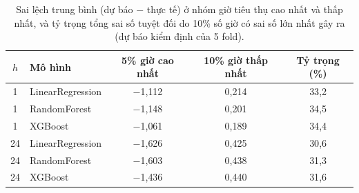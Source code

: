 \begin{table}[htbp]
\centering
\caption[Mức độ tập trung của sai số]{Sai lệch trung bình (dự báo $-$ thực tế) ở nhóm giờ tiêu thụ cao nhất và thấp nhất, và tỷ trọng tổng sai số tuyệt đối do 10\% số giờ có sai số lớn nhất gây ra (dự báo kiểm định của 5 fold).}
\label{tab:error_conc}
\small
\begin{tabular}{|c|l|c|c|c|}
\hline
\textbf{$h$} & \textbf{Mô hình} & \textbf{5\% giờ cao nhất} & \textbf{10\% giờ thấp nhất} & \textbf{Tỷ trọng (\%)} \\
\hline
1 & LinearRegression & $-$1{,}112 & 0{,}214 & 33{,}2 \\ \hline
1 & RandomForest & $-$1{,}148 & 0{,}201 & 34{,}5 \\ \hline
1 & XGBoost & $-$1{,}061 & 0{,}189 & 34{,}4 \\ \hline
24 & LinearRegression & $-$1{,}626 & 0{,}425 & 30{,}6 \\ \hline
24 & RandomForest & $-$1{,}603 & 0{,}438 & 31{,}3 \\ \hline
24 & XGBoost & $-$1{,}436 & 0{,}440 & 31{,}6 \\ \hline
\end{tabular}
\end{table}
